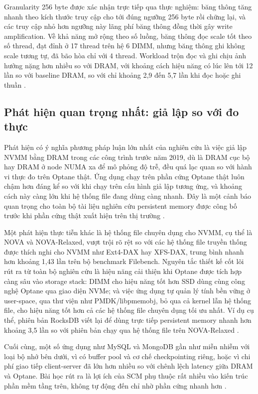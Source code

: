 \documentclass[12pt,a4paper]{article}
\begin{document}
Granularity 256 byte được xác nhận trực tiếp qua thực nghiệm: băng thông tăng nhanh theo kích thước truy cập cho tới đúng ngưỡng 256 byte rồi chững lại, và các truy cập nhỏ hơn ngưỡng này lãng phí băng thông đồng thời gây write amplification. Về khả năng mở rộng theo số luồng, băng thông đọc scale tốt theo số thread, đạt đỉnh ở 17 thread trên hệ 6 DIMM, nhưng băng thông ghi không scale tương tự, đã bão hòa chỉ với 4 thread. Workload trộn đọc và ghi chịu ảnh hưởng nặng hơn nhiều so với DRAM, với khoảng cách hiệu năng có lúc lên tới 12 lần so với baseline DRAM, so với chỉ khoảng 2,9 đến 5,7 lần khi đọc hoặc ghi thuần \cite{izraelevitz2019}.

\subsection{Phát hiện quan trọng nhất: giả lập so với đo thực}

Phát hiện có ý nghĩa phương pháp luận lớn nhất của nghiên cứu là việc giả lập NVMM bằng DRAM trong các công trình trước năm 2019, dù là DRAM cục bộ hay DRAM ở node NUMA xa để mô phỏng độ trễ, đều quá lạc quan so với hành vi thực đo trên Optane thật. Ứng dụng chạy trên phần cứng Optane thật luôn chậm hơn đáng kể so với khi chạy trên cấu hình giả lập tương ứng, và khoảng cách này càng lớn khi hệ thống file đang dùng càng nhanh. Đây là một cảnh báo quan trọng cho toàn bộ tài liệu nghiên cứu persistent memory được công bố trước khi phần cứng thật xuất hiện trên thị trường \cite{izraelevitz2019}.

Một phát hiện thực tiễn khác là hệ thống file chuyên dụng cho NVMM, cụ thể là NOVA và NOVA-Relaxed, vượt trội rõ rệt so với các hệ thống file truyền thống được thích nghi cho NVMM như Ext4-DAX hay XFS-DAX, trung bình nhanh hơn khoảng 1,43 lần trên bộ benchmark Filebench. Nguyên tắc thiết kế cốt lõi rút ra từ toàn bộ nghiên cứu là hiệu năng cải thiện khi Optane được tích hợp càng sâu vào storage stack: DIMM cho hiệu năng tốt hơn SSD dùng cùng công nghệ Optane qua giao diện NVMe; và việc ứng dụng tự quản lý tính bền vững ở user-space, qua thư viện như PMDK/libpmemobj, bỏ qua cả kernel lẫn hệ thống file, cho hiệu năng tốt hơn cả các hệ thống file chuyên dụng tối ưu nhất. Ví dụ cụ thể, phiên bản RocksDB viết lại để dùng trực tiếp persistent memory nhanh hơn khoảng 3,5 lần so với phiên bản chạy qua hệ thống file trên NOVA-Relaxed \cite{izraelevitz2019}.

Cuối cùng, một số ứng dụng như MySQL và MongoDB gần như miễn nhiễm với loại bộ nhớ bên dưới, vì có buffer pool và cơ chế checkpointing riêng, hoặc vì chi phí giao tiếp client-server đã lớn hơn nhiều so với chênh lệch latency giữa DRAM và Optane. Bài học rút ra là lợi ích của SCM phụ thuộc rất nhiều vào kiến trúc phần mềm tầng trên, không tự động đến chỉ nhờ phần cứng nhanh hơn \cite{izraelevitz2019}.
\end{document}

